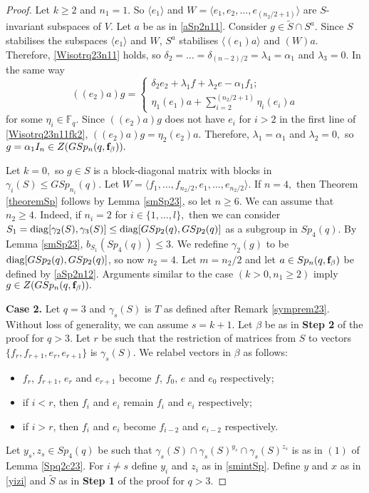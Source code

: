 \begin{proof}
Let $k \ge 2$ and $n_1 = 1.$ So $\langle e_1\rangle$ and $W=\langle e_1, e_2, \ldots, e_{(n_2/2+1)} \rangle $ are $S$-invariant subspaces of $V$. Let $a$ be as in \eqref{aSp2n11}. Consider $g \in \tilde{S} \cap S^a.$  Since $S$ stabilises the subspaces $\langle e_1 \rangle$ and $W$,  $S^a$ stabilises $\langle (e_1)a \rangle$ and $(W)a.$ Therefore, \eqref{Wisotrq23n11} holds, so $\delta_2= \ldots = \delta_{(n-2)/2}=\lambda_4=\alpha_1$ and $\lambda_3=0.$
In the same way 
\begin{equation}\label{Wisotrq23n11fk2}
((e_2)a)g=
\begin{cases}
\delta_2 e_2 + \lambda_1 f +\lambda_2 e - \alpha_1 f_1;\\
\eta_1 (e_1)a+ \sum_{i=2}^{(n_2/2+1)} \eta_i (e_i)a
\end{cases}
\end{equation}
for some $\eta_i \in \mathbb{F}_q.$  Since $((e_2)a)g$ does not have $e_i$ for $i>2$  in the first line of \eqref{Wisotrq23n11fk2}, $((e_2)a)g= \eta_2 (e_2)a$. Therefore, 
$\lambda_1=\alpha_1$ and $\lambda_2=0,$ so $g= \alpha_1 I_n \in Z(GSp_n(q, {\bf f}_{\beta})).$

Let $k=0,$ so $g \in S$ is a block-diagonal matrix with blocks in $\gamma_i(S) \le GSp_{n_i}(q).$ Let $W= \langle f_1, \ldots, f_{n_2/2}, e_1, \ldots, e_{n_2/2} \rangle$. If $n=4,$ then  Theorem \ref{theoremSp} follows by Lemma \ref{smSp23}, so let $n \ge 6.$ We can assume that $n_2 \ge 4.$ Indeed, if  $n_i=2$ for $i \in \{1, \ldots, l\},$ then we can consider $S_1=\mathrm{diag} [\gamma_2(S), \gamma_3(S)] \le \mathrm{diag}[GSp_2(q), GSp_2(q)]$ as a subgroup in $Sp_4(q)$. By Lemma \ref{smSp23}, $b_{S_1}(Sp_4(q))\le 3.$ We redefine $\gamma_2(g)$ to be $\mathrm{diag}[GSp_2(q), GSp_2(q)]$, so now $n_2=4.$   Let $m=n_2/2$ and let $a \in Sp_n(q, {\bf f}_{\beta})$ be defined by \eqref{aSp2n12}.  Arguments similar to the case $(k>0, n_1 \ge 2)$ imply $g \in Z(GSp_n(q, {\bf f}_{\beta})).$



\medskip

{\bf Case 2.} Let $q=3$ and $\gamma_s(S)$ is $T$ as defined  after Remark \ref{symprem23}.
Without loss of generality, we can assume $s=k+1.$  Let $\beta$ be as in {\bf Step 2} of the proof for $q>3$. Let $r$ be such that the restriction of matrices from $S$ to vectors $\{f_r, f_{r+1}, e_r, e_{r+1}\}$ is $\gamma_s(S).$ We relabel vectors in $\beta$ as follows:
\begin{itemize}
\item $f_r$, $f_{r+1}$, $e_r$ and  $e_{r+1}$ become $f$, $f_0$, $e$ and $e_0$ respectively;
\item if $i<r$, then $f_i$ and $e_i$ remain $f_i$ and $e_i$ respectively;
\item if $i>r$, then  $f_i$ and $e_i$ become $f_{i-2}$ and $e_{i-2}$ respectively.
\end{itemize}
Let  ${y}_s, {z}_s \in Sp_4(q)$ be such that $\gamma_s(S) \cap \gamma_s(S)^{{y}_s} \cap \gamma_s(S)^{{z}_s}$ is as in $(1)$ of Lemma \ref{Spq2c23}. For $i \ne s$ define $y_i$ and $z_i$ as in \eqref{smintSp}. Define $y$ and $x$ as in \eqref{yizi} and $\tilde{S}$ as in {\bf Step 1} of the proof for $q>3.$



\end{proof}
